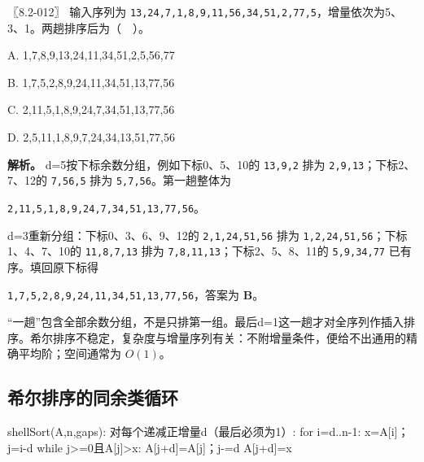 \begin{example}[配套案例]

〖8.2-012〗 输入序列为 \texttt{13,\allowbreak{}24,\allowbreak{}7,\allowbreak{}1,\allowbreak{}8,\allowbreak{}9,\allowbreak{}11,\allowbreak{}56,\allowbreak{}34,\allowbreak{}51,\allowbreak{}2,\allowbreak{}77,\allowbreak{}5}，增量依次为5、3、1。两趟排序后为（　）。

A. 1,7,8,9,13,24,11,34,51,2,5,56,77

B. 1,7,5,2,8,9,24,11,34,51,13,77,56

C. 2,11,5,1,8,9,24,7,34,51,13,77,56

D. 2,5,11,1,8,9,7,24,34,13,51,77,56

\end{example}

\textbf{解析。} d=5按下标余数分组，例如下标0、5、10的 \texttt{13,\allowbreak{}9,\allowbreak{}2} 排为 \texttt{2,\allowbreak{}9,\allowbreak{}13}；下标2、7、12的 \texttt{7,\allowbreak{}56,\allowbreak{}5} 排为 \texttt{5,\allowbreak{}7,\allowbreak{}56}。第一趟整体为

\texttt{2,\allowbreak{}11,\allowbreak{}5,\allowbreak{}1,\allowbreak{}8,\allowbreak{}9,\allowbreak{}24,\allowbreak{}7,\allowbreak{}34,\allowbreak{}51,\allowbreak{}13,\allowbreak{}77,\allowbreak{}56}。

d=3重新分组：下标0、3、6、9、12的 \texttt{2,\allowbreak{}1,\allowbreak{}24,\allowbreak{}51,\allowbreak{}56} 排为 \texttt{1,\allowbreak{}2,\allowbreak{}24,\allowbreak{}51,\allowbreak{}56}；下标1、4、7、10的 \texttt{11,\allowbreak{}8,\allowbreak{}7,\allowbreak{}13} 排为 \texttt{7,\allowbreak{}8,\allowbreak{}11,\allowbreak{}13}；下标2、5、8、11的 \texttt{5,\allowbreak{}9,\allowbreak{}34,\allowbreak{}77} 已有序。填回原下标得

\texttt{1,\allowbreak{}7,\allowbreak{}5,\allowbreak{}2,\allowbreak{}8,\allowbreak{}9,\allowbreak{}24,\allowbreak{}11,\allowbreak{}34,\allowbreak{}51,\allowbreak{}13,\allowbreak{}77,\allowbreak{}56}，答案为 \textbf{B}。

``一趟''包含全部余数分组，不是只排第一组。最后d=1这一趟才对全序列作插入排序。希尔排序不稳定，复杂度与增量序列有关：不附增量条件，便给不出通用的精确平均阶；空间通常为 \(O(1)\)。

\subsection{希尔排序的同余类循环}\label{DS08-shell-code}

\begin{codeblock}[language={}]
shellSort(A,n,gaps):
    对每个递减正增量d（最后必须为1）:
        for i=d..n-1:
            x=A[i]；j=i-d
            while j>=0且A[j]>x:
                A[j+d]=A[j]；j-=d
            A[j+d]=x
\end{codeblock}

